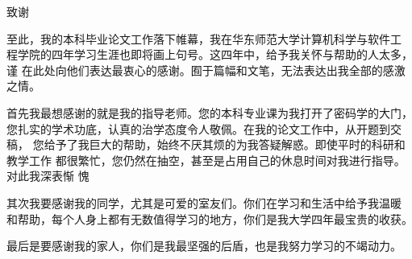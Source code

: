 \clearpage                              %
\centerline{ \heiti 致谢}                          %

至此，我的本科毕业论文工作落下帷幕，我在华东师范大学计算机科学与软件工
程学院的四年学习生涯也即将画上句号。这四年中，给予我关怀与帮助的人太多，谨
在此处向他们表达最衷心的感谢。囿于篇幅和文笔，无法表达出我全部的感激之情。

首先我最想感谢的就是我的指导老师。您的本科专业课为我打开了密码学的大门，
您扎实的学术功底，认真的治学态度令人敬佩。在我的论文工作中，从开题到交稿，
您给予了我巨大的帮助，始终不厌其烦的为我答疑解惑。即使平时的科研和教学工作
都很繁忙，您仍然在抽空，甚至是占用自己的休息时间对我进行指导。对此我深表惭
愧

其次我要感谢我的同学，尤其是可爱的室友们。你们在学习和生活中给予我温暖
和帮助，每个人身上都有无数值得学习的地方，你们是我大学四年最宝贵的收获。

最后是要感谢我的家人，你们是我最坚强的后盾，也是我努力学习的不竭动力。